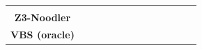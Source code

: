 \begin{table}[t]
{\begin{tabular}{c|ccc|ccc|ccc|ccc}
       & \EXPtodo{--}                          & \EXPtodo{--} & \EXPtodo{--}   \\
      \textbf{Z3-Noodler}
       & \EXPtodo{--}                          & \EXPtodo{--} & \EXPtodo{--}
       & \EXPtodo{--}                          & \EXPtodo{--} & \EXPtodo{--}
       & \EXPtodo{--}                          & \EXPtodo{--} & \EXPtodo{--}
       & \EXPtodo{--}                          & \EXPtodo{--} & \EXPtodo{--}   \\
      \midrule
      \textbf{VBS (oracle)}
       & \EXPtodo{--}                          & \EXPtodo{--} & \EXPtodo{--}
       & \EXPtodo{--}                          & \EXPtodo{--} & \EXPtodo{--}
       & \EXPtodo{--}                          & \EXPtodo{--} & \EXPtodo{--}
       & \EXPtodo{--}                          & \EXPtodo{--} & \EXPtodo{--}   \\
      \bottomrule
    \end{tabular}%
  }
  \vspace{-1.0em}
\end{table}


